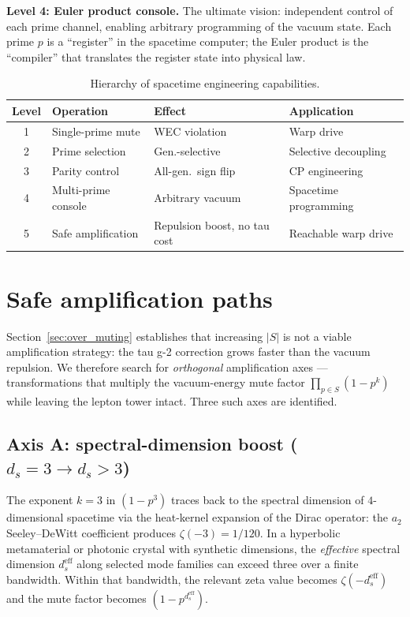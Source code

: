 \documentclass[11pt,a4paper]{article}
\begin{document}
\textbf{Level 4: Euler product console.}
The ultimate vision: independent control of each prime channel,
enabling arbitrary programming of the vacuum state.
Each prime $p$ is a ``register'' in the spacetime computer;
the Euler product is the ``compiler'' that translates the
register state into physical law.

\begin{table}[h]
\centering
\caption{Hierarchy of spacetime engineering capabilities.}
\label{tab:hierarchy}
\begin{tabular}{@{}clll@{}}
\toprule
Level & Operation & Effect & Application \\
\midrule
1 & Single-prime mute & WEC violation & Warp drive \\
2 & Prime selection & Gen.-selective & Selective decoupling \\
3 & Parity control & All-gen.\ sign flip & CP engineering \\
4 & Multi-prime console & Arbitrary vacuum & Spacetime programming \\
5 & Safe amplification & Repulsion boost, no tau cost & Reachable warp drive \\
\bottomrule
\end{tabular}
\end{table}

\section{Safe amplification paths}
\label{sec:safe_amplification}

Section~\ref{sec:over_muting} establishes that increasing $|S|$ is
not a viable amplification strategy: the tau g-2 correction grows
faster than the vacuum repulsion. We therefore search for
\emph{orthogonal} amplification axes --- transformations that
multiply the vacuum-energy mute factor $\prod_{p\in S}(1-p^k)$
while leaving the lepton tower intact. Three such axes are
identified.

\subsection{Axis A: spectral-dimension boost ($d_s=3 \to d_s>3$)}
\label{sec:axis_A}

The exponent $k=3$ in $(1-p^3)$ traces back to the spectral
dimension of $4$-dimensional spacetime via the heat-kernel
expansion of the Dirac operator: the $a_2$ Seeley--DeWitt
coefficient produces $\zeta(-3) = 1/120$. In a hyperbolic
metamaterial or photonic crystal with synthetic dimensions, the
\emph{effective} spectral dimension $d_s^{\mathrm{eff}}$ along
selected mode families can exceed three over a finite bandwidth.
Within that bandwidth, the relevant zeta value becomes
$\zeta(-d_s^{\mathrm{eff}})$ and the mute factor becomes
$(1-p^{d_s^{\mathrm{eff}}})$.
\end{document}
